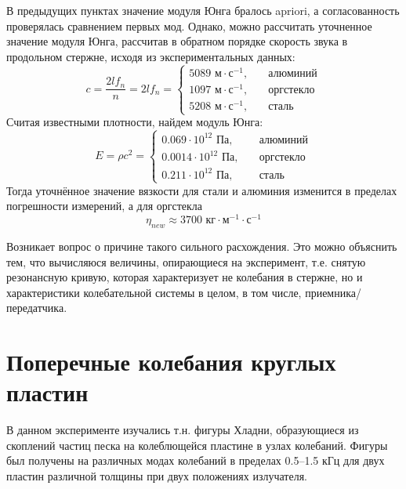 В предыдущих пунктах значение модуля Юнга бралось apriori, а согласованность проверялась сравнением первых мод. Однако, можно рассчитать уточненное значение модуля Юнга, рассчитав в обратном порядке скорость звука в продольном стержне, исходя из экспериментальных данных:
\begin{equation}
	c=\frac{2l f_n}{n}=2lf_n=
	\left\{
	\begin{aligned}
		5089 \text{ м}\cdot\text{с}^{-1},&\quad \text{алюминий}\\
		1097 \text{ м}\cdot\text{с}^{-1},&\quad \text{оргстекло}\\
		5208 \text{ м}\cdot\text{с}^{-1},&\quad \text{сталь}
	\end{aligned}
	\right.
\end{equation}
Считая известными плотности, найдем модуль Юнга:
\begin{equation}
	E = \rho c^2=
	\left\{
	\begin{aligned}
		0.069\cdot 10^{12}\text{ Па},&\quad \text{алюминий}\\
		0.0014\cdot 10^{12}\text{ Па},&\quad \text{оргстекло}\\
		0.211\cdot 10^{12}\text{ Па},&\quad \text{сталь}
	\end{aligned}
	\right.
\end{equation}
Тогда уточнённое значение вязкости для стали и алюминия изменится в пределах погрешности измерений, а для оргстекла
\begin{equation}
	\eta_{new}\approx 3700 \text{ кг}\cdot\text{м}^{-1}\cdot\text{с}^{-1}
\end{equation}

Возникает вопрос о причине такого сильного расхождения. Это можно объяснить тем, что вычисляюся величины, опирающиеся на эксперимент, т.е. снятую резонансную кривую, которая характеризует не колебания в стержне, но и характеристики колебательной системы в целом, в том числе, приемника/передатчика.

\newpage

\section{Поперечные колебания круглых пластин}

В данном эксперименте изучались т.н. фигуры Хладни, образующиеся из скоплений частиц песка на колеблющейся пластине в узлах колебаний. Фигуры был получены на различных модах колебаний в пределах 0.5--1.5 кГц для двух пластин различной толщины при двух положениях излучателя.

